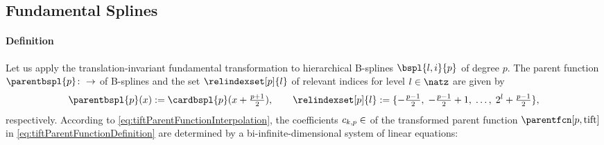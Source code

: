 \subsection{Fundamental Splines}
\label{sec:443fundamentalSplines}

\paragraph{Definition}

Let us apply the translation-invariant fundamental transformation
to hierarchical B-splines $\bspl{l,i}{p}$ of degree $p$.
The parent function $\parentbspl{p}\colon \real \to \real$ of B-splines
and the set $\relindexset[p]{l}$ of relevant indices for level $l \in \natz$
are given by
\begin{equation}
  \parentbspl{p}(x)
  := \cardbspl{p}(x + \tfrac{p+1}{2}),\qquad
  \relindexset[p]{l}
  := \{-\tfrac{p-1}{2},\;
  -\tfrac{p-1}{2} + 1,\;
  \dotsc,\;
  2^l + \tfrac{p-1}{2}\},
\end{equation}
respectively.
According to \eqref{eq:tiftParentFunctionInterpolation},
the coefficients $\fundsplcoeff{k}{p} \in \real$ of
the transformed parent function $\parentfcn[p,\tift]$
in \cref{eq:tiftParentFunctionDefinition} are determined by a
bi-infinite-dimensional system of linear equations:
